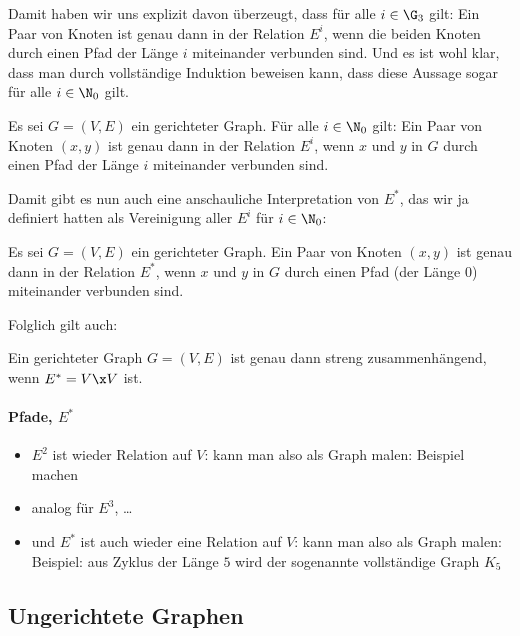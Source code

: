 Damit haben wir uns explizit davon überzeugt, dass für alle $i\in\G_3$
gilt: Ein Paar von Knoten ist genau dann in der Relation $E^i$, wenn
die beiden Knoten durch einen Pfad der Länge $i$ miteinander verbunden
sind.
% 
Und es ist wohl klar, dass man durch vollständige Induktion beweisen
kann, dass diese Aussage sogar für alle $i\in \N_0$ gilt.
% 
\begin{lemma} Es sei $G=(V,E)$ ein gerichteter Graph.
  Für alle $i\in\N_0$ gilt: Ein Paar von Knoten $(x,y)$ ist genau dann
in der Relation $E^i$, wenn $x$ und $y$ in $G$ durch einen Pfad der
Länge $i$ miteinander verbunden sind.
\end{lemma}
% 
Damit gibt es nun auch eine anschauliche Interpretation von $E^*$, das
wir ja definiert hatten als Vereinigung aller $E^i$ für $i\in\N_0$:
% 
\begin{korollar} Es sei $G=(V,E)$ ein gerichteter Graph.
  Ein Paar von Knoten $(x,y)$ ist genau dann in der Relation $E^*$,
wenn $x$ und $y$ in $G$ durch einen Pfad (\evtl der Länge $0$)
miteinander verbunden sind.
\end{korollar}
% 
Folglich gilt auch:
% 
\begin{korollar} Ein gerichteter Graph $G=(V,E)$ ist genau dann streng
zusammenhängend, wenn $E^*=V\x V$ ist.
\end{korollar}

\begin{tutorium} 
  \paragraph{Pfade, $E^*$}
  \begin{itemize}
  \item $E^2$ ist wieder Relation auf $V$: kann man also als Graph
malen: Beispiel machen
  \item analog für $E^3$, \dots
  \item und $E^*$ ist auch wieder eine Relation auf $V$: kann man also
als Graph malen: Beispiel: aus Zyklus der Länge $5$ wird der
sogenannte vollständige Graph $K_5$
  \end{itemize}
\end{tutorium}

\begin{extract*}
  \section{Ungerichtete Graphen}
\end{extract*}
\label{sub:undigraph}

